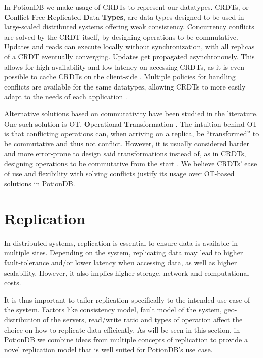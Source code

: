 In PotionDB we make usage of CRDTs \cite{crdt} to represent our datatypes.
CRDTs, or \textbf{C}onflict-Free  \textbf{R}eplicated \textbf{D}ata \textbf{Types}, are data types designed to be used in large-scaled distributed systems offering weak consistency.
Concurrency conflicts are solved by the CRDT itself, by designing operations to be commutative.
Updates and reads can execute locally without synchronization, with all replicas of a CRDT eventually converging.
Updates get propagated asynchronously.
This allows for high availability and low latency on accessing CRDTs, as it is even possible to cache CRDTs on the client-side \cite{legion, swiftcloud, castineira2015collaborative}.
Multiple policies for handling conflicts are available for the same datatypes, allowing CRDTs to more easily adapt to the needs of each application \cite{crdtMultipolicy, crdt}.

Alternative solutions based on commutativity have been studied in the literature. 
One such solution is OT, \textbf{O}perational \textbf{T}ransformation \cite{ot, otCorrectness}.
The intuition behind OT is that conflicting operations can, when arriving on a replica, be ``transformed'' to be commutative and thus not conflict.
However, it is usually considered harder and more error-prone to design said transformations instead of, as in CRDTs, designing operations to be commutative from the start \cite{otCorrectness, crdt}.
We believe CRDTs' ease of use and flexibility with solving conflicts justify its usage over OT-based solutions in PotionDB.

\section{Replication}
\label{sec:replication}


In distributed systems, replication is essential to ensure data is available in multiple sites.
Depending on the system, replicating data may lead to higher fault-tolerance and/or lower latency when accessing data, as well as higher scalability.
However, it also implies higher storage, network and computational costs.

It is thus important to tailor replication specifically to the intended use-case of the system.
Factors like consistency model, fault model of the system, geo-distribution of the servers, read/write ratio and types of operation affect the choice on how to replicate data efficiently.
As will be seen in this section, in PotionDB we combine ideas from multiple concepts of replication to provide a novel replication model that is well suited for PotionDB's use case.

